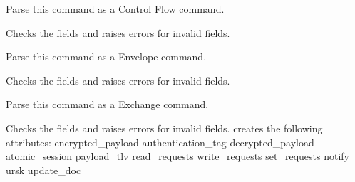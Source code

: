 \documentclass[letterpaper,10pt,english]{sphinxmanual}
\begin{document}
\begin{fulllineitems}
\begin{fulllineitems}
\label{\detokenize{aliro_actuator.access_protocol.apdu:aliro_actuator.access_protocol.apdu.Command.parse_as_control_flow}}
\pysigstartsignatures
{}
\pysigstopsignatures
\sphinxAtStartPar
Parse this command as a Control Flow command.

\sphinxAtStartPar
Checks the fields and raises errors for invalid fields.

\end{fulllineitems}


\begin{fulllineitems}
\label{\detokenize{aliro_actuator.access_protocol.apdu:aliro_actuator.access_protocol.apdu.Command.parse_as_envelope}}
\pysigstartsignatures
{}
\pysigstopsignatures
\sphinxAtStartPar
Parse this command as a Envelope command.

\sphinxAtStartPar
Checks the fields and raises errors for invalid fields.

\end{fulllineitems}


\begin{fulllineitems}
\label{\detokenize{aliro_actuator.access_protocol.apdu:aliro_actuator.access_protocol.apdu.Command.parse_as_exchange}}
\pysigstartsignatures
{}
\pysigstopsignatures
\sphinxAtStartPar
Parse this command as a Exchange command.

\sphinxAtStartPar
Checks the fields and raises errors for invalid fields.
creates the following attributes:
encrypted\_payload
authentication\_tag
decrypted\_payload
atomic\_session
payload\_tlv
read\_requests
write\_requests
set\_requests
notify
ursk
update\_doc


\end{fulllineitems}
\end{fulllineitems}
\end{document}
